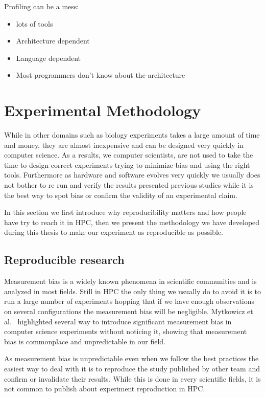 Profiling can be a mess:
\begin{itemize}
    \item lots of tools
    \item Architecture dependent
    \item Language dependent
    \item Most programmers don't know about the architecture
\end{itemize}

\section{Experimental Methodology}
\label{sec:expe-methodo}

While in other domains such as biology experiments takes a large amount of
time and money, they are almost inexpensive and can be designed very quickly
in computer science. As a results, we computer scientists, are not used to
take the time to design correct experiments trying to minimize bias and using
the right tools. Furthermore as hardware and software evolves very quickly we
usually does not bother to re run and verify the results presented previous
studies while it is the best way to spot bias or confirm the validity of an
experimental claim.

In this section we first introduce why reproducibility matters and how people
have try to reach it in \gls{HPC}, then we present the methodology we have
developed during this thesis to make our experiment as reproducible as
possible.


\subsection{Reproducible research}

Measurement bias is a widely known phenomena in scientific communities and is
analyzed in most fields. Still in \gls{HPC} the only thing we usually do to avoid it
is to run a large number of experiments hopping that if we have enough
observations on several configurations the measurement bias will be
negligible. Mytkowicz et al.~\cite{Mytkowicz09Producing} highlighted several
way to introduce significant measurement bias in computer science experiments
without noticing it, showing that measurement bias is commonplace and
unpredictable in our field.

As measurement bias is unpredictable even when we follow the best practices
the easiest way to deal with it is to reproduce the study published by other
team and confirm or invalidate their results. While this is done in every
scientific fields, it is not common to publish about experiment reproduction
in \gls{HPC}.

